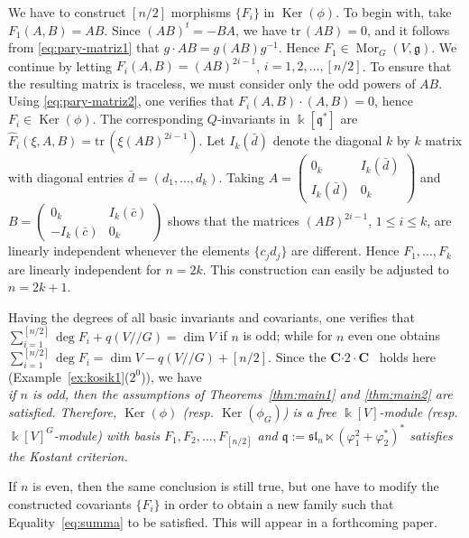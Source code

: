 \begin{ex}
\noindent We have to construct $[n/2]$ morphisms $\{F_i\}$ in ${\operatorname{Ker}}(\phi)$. To begin with, take
$F_1(A,B)=AB$. Since $(AB)^t=-BA$, we have ${{\mathrm{tr\,}}}(AB)=0$, and it follows from \eqref{eq:pary-matriz1} that  $g{\cdot}AB=g(AB)g^{-1}$. Hence $F_1\in{\operatorname{Mor}}_G(V,{{\mathfrak g}})$. We continue  by letting
$F_i(A,B)=(AB)^{2i-1}$, $i=1,2,\dots,[n/2]$. To ensure that the resulting matrix is traceless, we must consider only the odd powers of $AB$. Using \eqref{eq:pary-matriz2}, one verifies that
$F_i(A,B){\cdot}(A,B)=0$, hence $F_i\in {\operatorname{Ker}} (\phi)$. 
The corresponding $Q$-invariants in ${\Bbbk}[{{\mathfrak q}}^*]$ are
$\hat F_i(\xi,A,B)={{\mathrm{tr\,}}}(\xi(AB)^{2i-1})$.   Let $I_k(\bar d)$ denote the diagonal $k$ by $k$ matrix with diagonal entries $\bar d=(d_1,\dots,d_k)$. Taking
$A=\begin{pmatrix} 0_k & I_k(\bar d) \\ I_k(\bar d) & 0_k \end{pmatrix}$ and 
$B=\begin{pmatrix} 0_k & I_k(\bar c) \\ -I_k(\bar c) & 0_k \end{pmatrix}$ shows that the matrices
$(AB)^{2i-1}$, $1{\leqslant} i{\leqslant} k$, are linearly independent whenever the elements $\{c_jd_j\}$ are different.
Hence $F_1,\dots,F_k$ are linearly independent for $n=2k$. This construction can easily be adjusted to 
$n=2k+1$.

Having the degrees of all basic invariants and covariants, one verifies that 
$\sum_{i=1}^{[n/2]} \deg F_i+ q(V{/\!\!/} G)=\dim V$ if $n$ is odd; while for $n$ even
one obtains $\sum_{i=1}^{[n/2]} \deg F_i=\dim V- q(V{/\!\!/} G)+ [n/2]$.
Since the {\textsf{\bfseries C${\cdot}2{\cdot}$C}\ } holds here (Example~\ref{ex:kosik1}($2^0$)), we have 
\\ \indent
{\sl if $n$ is odd, then the assumptions of Theorems~\ref{thm:main1} and \ref{thm:main2} 
are satisfied. Therefore, ${\operatorname{Ker}}(\phi)$ (resp. ${\operatorname{Ker}}(\phi_G)$) is a free ${\Bbbk}[V]$-module (resp. ${\Bbbk}[V]^G$-module) with basis $F_1,F_2,\dots,F_{[n/2]}$ and ${{\mathfrak q}}:={{\mathfrak{sl}}_n}\ltimes ({\varphi}_1^2+{\varphi}_2^*)^*$ satisfies the Kostant criterion.}

{If $n$ is even, then the same conclusion is still true, but one have to modify the constructed covariants 
$\{F_i\}$ in order to obtain a new family such that Equality~\eqref{eq:summa} to be satisfied. This will appear in a forthcoming paper.}
\end{ex}

